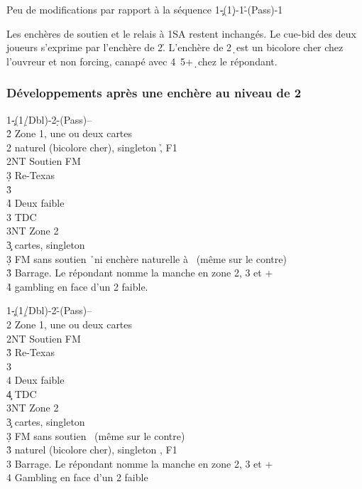 \documentclass[a4paper]{article}
\begin{document}
Peu de modifications par rapport à la séquence
1\c -(1\d )-1\h -(Pass)-1\s 

Les enchères de soutien et le relais à 1SA restent inchangés.
Le cue-bid des deux joueurs s’exprime par l’enchère de 2\h .
L’enchère de 2\d\ est un bicolore cher chez l’ouvreur et non forcing, canapé avec 4\s\ 5+\d\ chez le 
répondant.

\subsubsection{Développements après une enchère au niveau de 2}

\begin{bidtable}
1\c-(1\d/Dbl)-2\d-(Pass)--\\
2\h \> Zone 1, une ou deux cartes\\
2\s \> naturel (bicolore cher), singleton \h , F1\\
2NT \> Soutien FM\+\\
3\d \> Re-Texas\+\\
3\h\+\\
4\h \> Deux faible\\
3\s \> TDC\\
3NT \> Zone 2\-\-\-\\
3\c {} cartes, singleton \h \\
3\d \> FM sans soutien \h\ ni enchère naturelle à \s\ (même sur le contre)\\
3\h \> Barrage. Le répondant nomme la manche en zone 2, 3 et +\\
4\h \> gambling en face d'un 2 faible.
\end{bidtable}

\begin{bidtable}
1\c-(1\d/Dbl)-2\h-(Pass)--\\
2\s \> Zone 1, une ou deux cartes\\
2NT \> Soutien FM\+\\
3\h \> Re-Texas\+\\
3\s\+\\
4\s \> Deux faible\\
4\c \> TDC\\
3NT \> Zone 2\-\-\-\\
3\c {} cartes, singleton \s \\
3\d \> FM sans soutien \s\ (même sur le contre)\\
3\h \> naturel (bicolore cher), singleton \s , F1\\
3\s \> Barrage. Le répondant nomme la manche en zone 2, 3 et +\\
4\s \> Gambling en face d'un 2 faible
\end{bidtable}
\end{document}
